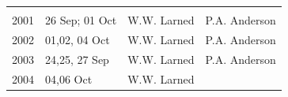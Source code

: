 \documentclass[]{article}
\begin{document}
\begin{longtable}[]{@{}llll@{}}
\begin{minipage}[t]{0.20\columnwidth}
\end{minipage}\tabularnewline
\begin{minipage}[t]{0.12\columnwidth}\raggedright\strut
2001\strut
\end{minipage} & \begin{minipage}[t]{0.38\columnwidth}\raggedright\strut
26 Sep; 01 Oct\strut
\end{minipage} & \begin{minipage}[t]{0.18\columnwidth}\raggedright\strut
W.W. Larned\strut
\end{minipage} & \begin{minipage}[t]{0.20\columnwidth}\raggedright\strut
P.A. Anderson\strut
\end{minipage}\tabularnewline
\begin{minipage}[t]{0.12\columnwidth}\raggedright\strut
2002\strut
\end{minipage} & \begin{minipage}[t]{0.38\columnwidth}\raggedright\strut
01,02, 04 Oct\strut
\end{minipage} & \begin{minipage}[t]{0.18\columnwidth}\raggedright\strut
W.W. Larned\strut
\end{minipage} & \begin{minipage}[t]{0.20\columnwidth}\raggedright\strut
P.A. Anderson\strut
\end{minipage}\tabularnewline
\begin{minipage}[t]{0.12\columnwidth}\raggedright\strut
2003\strut
\end{minipage} & \begin{minipage}[t]{0.38\columnwidth}\raggedright\strut
24,25, 27 Sep\strut
\end{minipage} & \begin{minipage}[t]{0.18\columnwidth}\raggedright\strut
W.W. Larned\strut
\end{minipage} & \begin{minipage}[t]{0.20\columnwidth}\raggedright\strut
P.A. Anderson\strut
\end{minipage}\tabularnewline
\begin{minipage}[t]{0.12\columnwidth}\raggedright\strut
2004\strut
\end{minipage} & \begin{minipage}[t]{0.38\columnwidth}\raggedright\strut
04,06 Oct\strut
\end{minipage} & \begin{minipage}[t]{0.18\columnwidth}\raggedright\strut
W.W. Larned\strut

\end{minipage}
\end{longtable}
\end{document}
